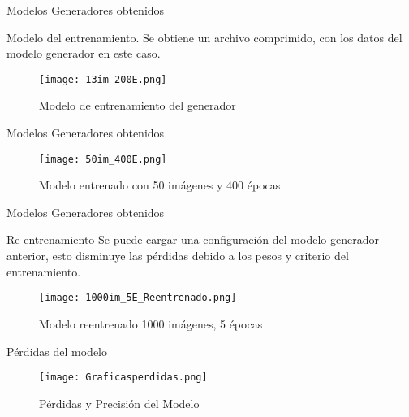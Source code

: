 \begin{frame}{Modelos Generadores obtenidos}
    \begin{block}{Modelo del entrenamiento.}
        Se obtiene un archivo comprimido, con los datos del modelo generador en este caso.
    \end{block}
    \begin{figure}[H]
        \begin{center}
          \texttt{[image: 13im\_200E.png]}
          \caption{Modelo de entrenamiento del generador}
          \label{Alexis6}
        \end{center}
    \end{figure}
    
\end{frame}

\begin{frame}{Modelos Generadores obtenidos}
  
    \begin{figure}[H]
        \begin{center}
          \texttt{[image: 50im\_400E.png]}
          \caption{Modelo entrenado con 50 imágenes y 400 épocas}
          \label{Alexis7}
        \end{center}
    \end{figure}
     
\end{frame}


\begin{frame}{Modelos Generadores obtenidos}
    \begin{block}{Re-entrenamiento}
        Se puede cargar una configuración del modelo generador anterior, esto disminuye las pérdidas 
        debido a los pesos y criterio del entrenamiento.
    \end{block}
    \begin{figure}[H]
        \begin{center}
          \texttt{[image: 1000im\_5E\_Reentrenado.png]}
          \caption{Modelo reentrenado 1000 imágenes, 5 épocas}
          \label{Alexis8}
        \end{center}
    \end{figure}
     
\end{frame}

\begin{frame}{Pérdidas del modelo}
    
    \begin{figure}[H]
        \begin{center}
          \texttt{[image: Graficasperdidas.png]}
          \caption{Pérdidas y Precisión del Modelo}
          \label{Alexis13}
        \end{center}
    \end{figure}
     
\end{frame}